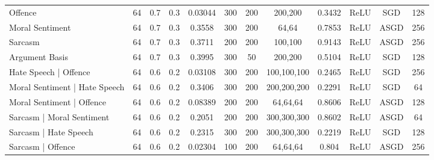 \begin{landscape}
\begin{table}[]
{\begin{tabular}{l|ccccccccccc}
      Offence                                                            & 64         & 0.7              & 0.3              & 0.03044 & 300           & 200    & 200,200                 & 0.3432        & ReLU          & SGD       & 128        \\
      Moral Sentiment                                                    & 64         & 0.7              & 0.3              & 0.3558  & 300           & 200    & 64,64                   & 0.7853        & ReLU          & ASGD      & 256        \\
      Sarcasm                                                            & 64         & 0.7              & 0.3              & 0.3711  & 200           & 200    & 100,100                 & 0.9143        & ReLU          & ASGD      & 256        \\
      Argument Basis                                                     & 64         & 0.7              & 0.3              & 0.3995  & 300           & 50     & 200,200                 & 0.5104        & ReLU          & SGD       & 128        \\ \hline
      Hate Speech | Offence                                              & 64         & 0.6              & 0.2              & 0.03108 & 300           & 200    & 100,100,100             & 0.2465        & ReLU          & SGD       & 256        \\
      Moral Sentiment | Hate Speech                                      & 64         & 0.6              & 0.2              & 0.3406  & 300           & 200    & 200,200,200             & 0.2291        & ReLU          & SGD       & 64         \\
      Moral Sentiment | Offence                                          & 64         & 0.6              & 0.2              & 0.08389 & 200           & 200    & 64,64,64                & 0.8606        & ReLU          & ASGD      & 128        \\
      Sarcasm | Moral Sentiment                                          & 64         & 0.6              & 0.2              & 0.2051  & 200           & 200    & 300,300,300             & 0.8602        & ReLU          & ASGD      & 64         \\
      Sarcasm | Hate Speech                                              & 64         & 0.6              & 0.2              & 0.2315  & 300           & 200    & 300,300,300             & 0.2219        & ReLU          & SGD       & 128        \\
      Sarcasm | Offence                                                  & 64         & 0.6              & 0.2              & 0.02304 & 100           & 200    & 64,64,64                & 0.804         & ReLU          & ASGD      & 256        \\

\end{tabular}}
\end{table}
\end{landscape}
